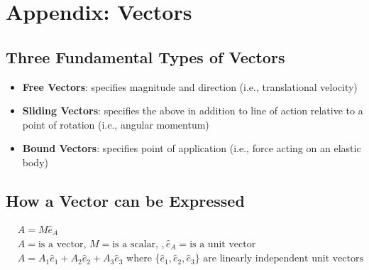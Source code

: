 \documentclass{article}
\begin{document}
\section{Appendix: Vectors}

\subsection{Three Fundamental Types of Vectors}
\begin{itemize}
    \item \textbf{Free Vectors}: specifies magnitude and direction (i.e., translational velocity)
    \item \textbf{Sliding Vectors}: specifies the above in addition to line of action relative to a point of rotation (i.e., angular momentum)
    \item \textbf{Bound Vectors}: specifies point of application (i.e., force acting on an elastic body)
\end{itemize}

\subsection{How a Vector can be Expressed}
\begin{align*}
    & A = M \hat{e}_{A} \\
    & A = \text{is a vector, } M = \text{is a scalar, }, \hat{e}_{A} = \text{is a unit vector} \\
    & A = A_1 \hat{e}_1 + A_2 \hat{e}_2 + A_3 \hat{e}_3 \text{ where } \{\hat{e}_1, \hat{e}_2, \hat{e}_3\} \text{ are linearly independent unit vectors}
\end{align*}
\end{document}
